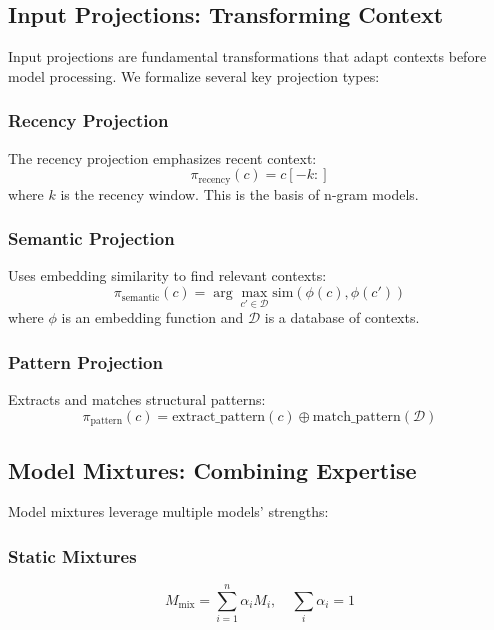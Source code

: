 \documentclass{article}
\theoremstyle{definition}
\begin{document}
\subsection{Input Projections: Transforming Context}

Input projections are fundamental transformations that adapt contexts before model processing. We formalize several key projection types:

\subsubsection{Recency Projection}

The recency projection emphasizes recent context:
\begin{equation}
\pi_{\text{recency}}(c) = c[-k:]
\end{equation}
where $k$ is the recency window. This is the basis of n-gram models.

\subsubsection{Semantic Projection}

Uses embedding similarity to find relevant contexts:
\begin{equation}
\pi_{\text{semantic}}(c) = \arg\max_{c' \in \mathcal{D}} \text{sim}(\phi(c), \phi(c'))
\end{equation}
where $\phi$ is an embedding function and $\mathcal{D}$ is a database of contexts.

\subsubsection{Pattern Projection}

Extracts and matches structural patterns:
\begin{equation}
\pi_{\text{pattern}}(c) = \text{extract\_pattern}(c) \oplus \text{match\_pattern}(\mathcal{D})
\end{equation}

\subsection{Model Mixtures: Combining Expertise}

Model mixtures leverage multiple models' strengths:

\subsubsection{Static Mixtures}
\begin{equation}
M_{\text{mix}} = \sum_{i=1}^n \alpha_i M_i, \quad \sum_i \alpha_i = 1
\end{equation}
\end{document}
